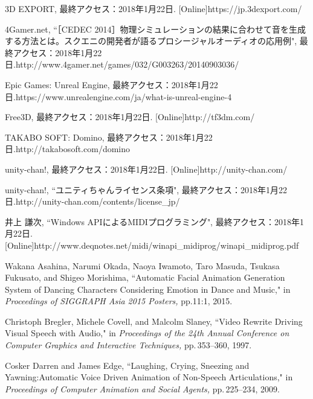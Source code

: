 \renewcommand{\refname}{参考文献}	
%
\begin{thebibliography}{55}
%
3D EXPORT, 最終アクセス：2018年1月22日.
[Online]https://jp.3dexport.com/

4Gamer.net, ``［CEDEC 2014］物理シミュレーションの結果に合わせて音を生成する方法とは。スクエニの開発者が語るプロシージャルオーディオの応用例", 最終アクセス：2018年1月22日.\newline
[Online]http://www.4gamer.net/games/032/G003263/20140903036/

Epic Games: Unreal Engine, 最終アクセス：2018年1月22日.\newline
[Online]https://www.unrealengine.com/ja/what-is-unreal-engine-4

Free3D, 最終アクセス：2018年1月22日.
[Online]http://tf3dm.com/

TAKABO SOFT: Domino, 最終アクセス：2018年1月22日.\newline
[Online]http://takabosoft.com/domino

unity-chan!, 最終アクセス：2018年1月22日.
[Online]http://unity-chan.com/

unity-chan!, ``ユニティちゃんライセンス条項", 最終アクセス：2018年1月22日.\newline
[Online]http://unity-chan.com/contents/license\_jp/

井上 謙次, ``Windows APIによるMIDIプログラミング", 最終アクセス：2018年1月22日.\,
[Online]http://www.deqnotes.net/midi/winapi\_midiprog/winapi\_midiprog.pdf

%

Wakana Asahina, Narumi Okada, Naoya Iwamoto, Taro Masuda, Tsukasa Fukusato, and Shigeo Morishima,
 ``Automatic Facial Animation Generation System of Dancing Characters Considering Emotion in Dance and Music,"
 in \textit{Proceedings of SIGGRAPH Asia 2015 Posters,} pp.11:1, 2015.

Christoph Bregler, Michele Covell, and Malcolm Slaney,
 ``Video Rewrite Driving Visual Speech with Audio,"
 in \textit{Proceedings of the 24th Annual Conference on Computer Graphics and Interactive Techniques,} pp.\,353--360, 1997.

Cosker Darren and James Edge,
 ``Laughing, Crying, Sneezing and Yawning:Automatic Voice Driven Animation of Non-Speech Articulations,"
 in \textit{Proceedings of Computer Animation and Social Agents,} pp.\,225--234, 2009.


\end{thebibliography}
